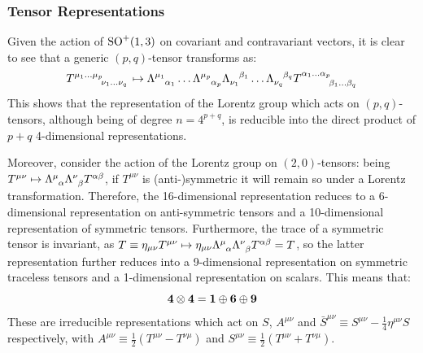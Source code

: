 
\subsubsection{Tensor Representations}

Given the action of $ \mathrm{SO}^+(1,3) $ on covariant and contravariant vectors, it is clear to see that a generic $ (p,q) $-tensor transforms as:
\begin{equation}
  \tensor{T}{^{\mu_1 \dots \mu_p}_{\nu_1 \dots \nu_q}} \mapsto \tensor{\Lambda}{^{\mu_1}_{\alpha_1}} \dots \tensor{\Lambda}{^{\mu_p}_{\alpha_p}} \tensor{\Lambda}{_{\nu_1}^{\beta_1}} \dots \tensor{\Lambda}{_{\nu_q}^{\beta_q}} \tensor{T}{^{\alpha_1 \dots \alpha_p}_{\beta_1 \dots \beta_q}}
\end{equation}
This shows that the representation of the Lorentz group which acts on $ (p,q) $-tensors, although being of degree $ n = 4^{p + q} $, is reducible into the direct product of $ p + q $ 4-dimensional representations.

Moreover, consider the action of the Lorentz group on $ (2,0) $-tensors: being $ T^{\mu \nu} \mapsto \tensor{\Lambda}{^\mu_\alpha} \tensor{\Lambda}{^\nu_\beta} T^{\alpha \beta} $, if $ T^{\mu \nu} $ is (anti-)symmetric it will remain so under a Lorentz transformation. Therefore, the 16-dimensional representation reduces to a 6-dimensional representation on anti-symmetric tensors and a 10-dimensional representation of symmetric tensors. Furthermore, the trace of a symmetric tensor is invariant, as $ T \equiv \eta_{\mu \nu} T^{\mu \nu} \mapsto \eta_{\mu \nu} \tensor{\Lambda}{^\mu _\alpha} \tensor{\Lambda}{^\nu _\beta} T^{\alpha \beta} = T $, so the latter representation further reduces into a 9-dimensional representation on symmetric traceless tensors and a 1-dimensional representation on scalars. This means that:
\begin{equation}
  \mathbf{4} \otimes \mathbf{4} = \mathbf{1} \oplus \mathbf{6} \oplus \mathbf{9}
  \label{eq:lor-tens-dec}
\end{equation}
These are irreducible representations which act on $ S $, $ A^{\mu \nu} $ and $ \bar{S}^{\mu \nu} \equiv S^{\mu \nu} - \frac{1}{4} \eta^{\mu \nu} S $ respectively, with $ A^{\mu \nu} \equiv \frac{1}{2} \left( T^{\mu \nu} - T^{\nu \mu} \right) $ and $ S^{\mu \nu} \equiv \frac{1}{2} \left( T^{\mu \nu} + T^{\nu \mu} \right) $.

